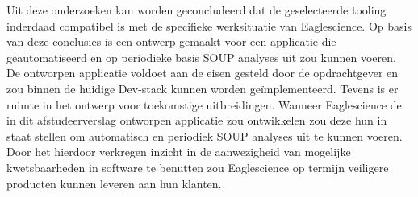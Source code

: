 Uit deze onderzoeken kan worden geconcludeerd dat de geselecteerde tooling inderdaad compatibel is met de specifieke werksituatie van Eaglescience. Op basis van deze conclusies is een ontwerp gemaakt voor een applicatie die geautomatiseerd en op periodieke basis SOUP analyses uit zou kunnen voeren. De ontworpen applicatie voldoet aan de eisen gesteld door de opdrachtgever en zou binnen de huidige Dev-stack kunnen worden geïmplementeerd. Tevens is er ruimte in het ontwerp voor toekomstige uitbreidingen. Wanneer Eaglescience de in dit afstudeerverslag ontworpen applicatie zou ontwikkelen zou deze hun in staat stellen om automatisch en periodiek SOUP analyses uit te kunnen voeren. Door het hierdoor verkregen inzicht in de aanwezigheid van mogelijke kwetsbaarheden in software te benutten zou Eaglescience op termijn veiligere producten kunnen leveren aan hun klanten.

\vfill
